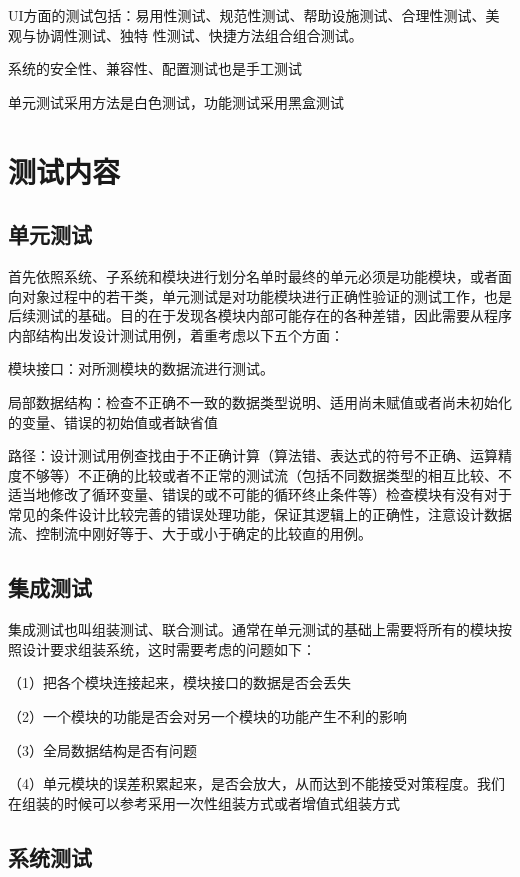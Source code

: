 UI方面的测试包括：易用性测试、规范性测试、帮助设施测试、合理性测试、美观与协调性测试、独特
性测试、快捷方法组合组合测试。

系统的安全性、兼容性、配置测试也是手工测试

单元测试采用方法是白色测试，功能测试采用黑盒测试

\section{测试内容}


\subsection{单元测试}

首先依照系统、子系统和模块进行划分名单时最终的单元必须是功能模块，或者面向对象过程中的若干类，单元测试是对功能模块进行正确性验证的测试工作，也是后续测试的基础。目的在于发现各模块内部可能存在的各种差错，因此需要从程序内部结构出发设计测试用例，着重考虑以下五个方面：

模块接口：对所测模块的数据流进行测试。

局部数据结构：检查不正确不一致的数据类型说明、适用尚未赋值或者尚未初始化的变量、错误的初始值或者缺省值

路径：设计测试用例查找由于不正确计算（算法错、表达式的符号不正确、运算精度不够等）不正确的比较或者不正常的测试流（包括不同数据类型的相互比较、不适当地修改了循环变量、错误的或不可能的循环终止条件等）检查模块有没有对于常见的条件设计比较完善的错误处理功能，保证其逻辑上的正确性，注意设计数据流、控制流中刚好等于、大于或小于确定的比较直的用例。

\subsection{集成测试}

集成测试也叫组装测试、联合测试。通常在单元测试的基础上需要将所有的模块按照设计要求组装系统，这时需要考虑的问题如下：

（1）把各个模块连接起来，模块接口的数据是否会丢失

（2）一个模块的功能是否会对另一个模块的功能产生不利的影响

（3）全局数据结构是否有问题

（4）单元模块的误差积累起来，是否会放大，从而达到不能接受对策程度。我们在组装的时候可以参考采用一次性组装方式或者增值式组装方式

\subsection{系统测试}

